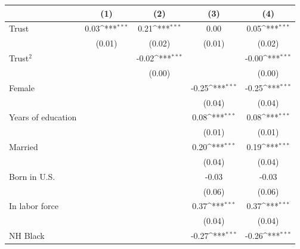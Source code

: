 {
\def\sym#1{\ifmmode^{#1}\else\(^{#1}\)\fi}
\begin{tabular*}{\linewidth}{@{\hskip\tabcolsep\extracolsep\fill}l*{4}{c}}
\toprule
                    &\multicolumn{1}{c}{(1)}&\multicolumn{1}{c}{(2)}&\multicolumn{1}{c}{(3)}&\multicolumn{1}{c}{(4)}\\
\midrule
Trust               &        0.03\sym{***}&        0.21\sym{***}&        0.00         &        0.05\sym{***}\\
                    &      (0.01)         &      (0.02)         &      (0.01)         &      (0.02)         \\
Trust$^2$           &                     &       -0.02\sym{***}&                     &       -0.00\sym{***}\\
                    &                     &      (0.00)         &                     &      (0.00)         \\
Female              &                     &                     &       -0.25\sym{***}&       -0.25\sym{***}\\
                    &                     &                     &      (0.04)         &      (0.04)         \\
Years of education  &                     &                     &        0.08\sym{***}&        0.08\sym{***}\\
                    &                     &                     &      (0.01)         &      (0.01)         \\
Married             &                     &                     &        0.20\sym{***}&        0.19\sym{***}\\
                    &                     &                     &      (0.04)         &      (0.04)         \\
Born in U.S.        &                     &                     &       -0.03         &       -0.03         \\
                    &                     &                     &      (0.06)         &      (0.06)         \\
In labor force      &                     &                     &        0.37\sym{***}&        0.37\sym{***}\\
                    &                     &                     &      (0.04)         &      (0.04)         \\
NH Black            &                     &                     &       -0.27\sym{***}&       -0.26\sym{***}\\

\end{tabular*}}
